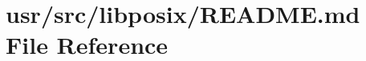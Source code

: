\hypertarget{usr_2src_2libposix_2README_8md}{\section{usr/src/libposix/\+R\+E\+A\+D\+M\+E.md File Reference}
\label{usr_2src_2libposix_2README_8md}
}
